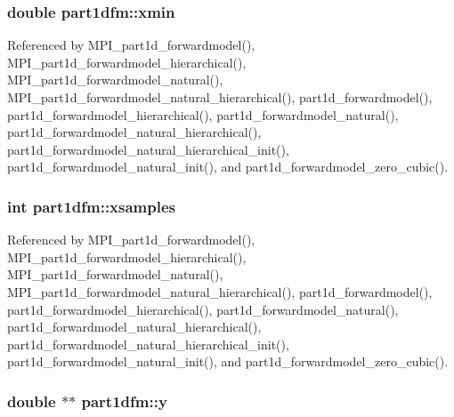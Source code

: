 \subsubsection[{\texorpdfstring{xmin}{xmin}}]{\setlength{\rightskip}{0pt plus 5cm}double part1dfm\+::xmin}\hypertarget{structpart1dfm_a4f2e23775e17a7de28e949745763af02}{}\label{structpart1dfm_a4f2e23775e17a7de28e949745763af02}


Referenced by M\+P\+I\+\_\+part1d\+\_\+forwardmodel(), M\+P\+I\+\_\+part1d\+\_\+forwardmodel\+\_\+hierarchical(), M\+P\+I\+\_\+part1d\+\_\+forwardmodel\+\_\+natural(), M\+P\+I\+\_\+part1d\+\_\+forwardmodel\+\_\+natural\+\_\+hierarchical(), part1d\+\_\+forwardmodel(), part1d\+\_\+forwardmodel\+\_\+hierarchical(), part1d\+\_\+forwardmodel\+\_\+natural(), part1d\+\_\+forwardmodel\+\_\+natural\+\_\+hierarchical(), part1d\+\_\+forwardmodel\+\_\+natural\+\_\+hierarchical\+\_\+init(), part1d\+\_\+forwardmodel\+\_\+natural\+\_\+init(), and part1d\+\_\+forwardmodel\+\_\+zero\+\_\+cubic().

\subsubsection[{\texorpdfstring{xsamples}{xsamples}}]{\setlength{\rightskip}{0pt plus 5cm}int part1dfm\+::xsamples}\hypertarget{structpart1dfm_a87a222abfa06dce76a4e7aadf2695f46}{}\label{structpart1dfm_a87a222abfa06dce76a4e7aadf2695f46}


Referenced by M\+P\+I\+\_\+part1d\+\_\+forwardmodel(), M\+P\+I\+\_\+part1d\+\_\+forwardmodel\+\_\+hierarchical(), M\+P\+I\+\_\+part1d\+\_\+forwardmodel\+\_\+natural(), M\+P\+I\+\_\+part1d\+\_\+forwardmodel\+\_\+natural\+\_\+hierarchical(), part1d\+\_\+forwardmodel(), part1d\+\_\+forwardmodel\+\_\+hierarchical(), part1d\+\_\+forwardmodel\+\_\+natural(), part1d\+\_\+forwardmodel\+\_\+natural\+\_\+hierarchical(), part1d\+\_\+forwardmodel\+\_\+natural\+\_\+hierarchical\+\_\+init(), part1d\+\_\+forwardmodel\+\_\+natural\+\_\+init(), and part1d\+\_\+forwardmodel\+\_\+zero\+\_\+cubic().

\subsubsection[{\texorpdfstring{y}{y}}]{\setlength{\rightskip}{0pt plus 5cm}double $\ast$$\ast$ part1dfm\+::y}\hypertarget{structpart1dfm_a9b3c68d30d4e9f3e607dd6063f770b36}{}\label{structpart1dfm_a9b3c68d30d4e9f3e607dd6063f770b36}


